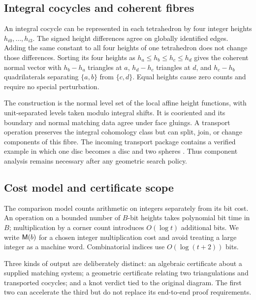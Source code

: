 \subsection{Integral cocycles and coherent fibres}

An integral cocycle can be represented in each tetrahedron by four
integer heights $h_{i0},\ldots,h_{i3}$. The signed height differences
agree on globally identified edges. Adding the same constant to all
four heights of one tetrahedron does not change those differences.
Sorting its four heights as $h_a\le h_b\le h_c\le h_d$ gives the
coherent normal vector with $h_b-h_a$ triangles at $a$,
$h_d-h_c$ triangles at $d$, and $h_c-h_b$ quadrilaterals separating
$\{a,b\}$ from $\{c,d\}$. Equal heights cause zero counts and require
no special perturbation.

The construction is the normal level set of the local affine height
functions, with unit-separated levels taken modulo integral shifts.
It is cooriented and its boundary and normal matching data agree under
face gluings. A transport operation preserves the integral cohomology
class but can split, join, or change components of this fibre. The
incoming transport package contains a verified example in which one
disc becomes a disc and two spheres \cite{priorTransport}. Thus component
analysis remains necessary after any geometric search policy.

\subsection{Cost model and certificate scope}

The comparison model counts arithmetic on integers separately from its
bit cost. An operation on a bounded number of $B$-bit heights takes
polynomial bit time in $B$; multiplication by a corner count introduces
$O(\log t)$ additional bits. We write $\mathsf M(b)$ for a chosen integer
multiplication cost and avoid treating a large integer as a machine word.
Combinatorial indices use $O(\log(t+2))$ bits.

Three kinds of output are deliberately distinct: an algebraic certificate
about a supplied matching system; a geometric certificate relating two
triangulations and transported cocycles; and a knot verdict tied to the
original diagram. The first two can accelerate the third but do not
replace its end-to-end proof requirements.
